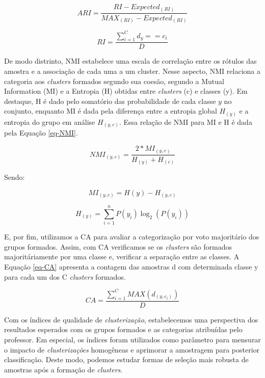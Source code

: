 \begin{equation}
ARI = \frac{RI - Expected_{(RI)}}{MAX_{(RI)} - Expected_{(RI)}}
\label{eq-ARI}
\end{equation}

\begin{equation*}
RI = \frac{\sum_{i=1}^{C} d_{y} == c_{i}}{D}
\end{equation*}

De modo distrinto, NMI estabelece uma escala de correlação entre os rótulos das amostra e a associação de cada uma a um cluster. Nesse aspecto, NMI relaciona a categoria aos \textit{clusters} formados segundo sua coesão, segundo a Mutual Information (MI) e a Entropia (H) obtidas entre \textit{clusters} (c) e classes (y). Em destaque, H é dado pelo somatório das probabilidade de cada classe $ y $ no conjunto, enquanto MI é dada pela diferença entre a entropia global $ H_{(y)} $ e a entropia do grupo em análise $ H_{(y, c)} $. Essa relação de NMI para MI e H é dada pela Equação \ref{eq-NMI}.

\begin{equation}
NMI_{(y,c)} = \frac{2*MI_{(y,c)}}{H_{(y)}+H_{(c)}}
\label{eq-NMI}
\end{equation}

Sendo:

\begin{equation*}
MI_{(y, c)} = H(y) - H_{(y, c)} 
\end{equation*}

\begin{equation*}
H_{(y)} = \sum_{i=1}^nP(y_{i})\log_{2}(P(y_{i}))
\end{equation*}

E, por fim, utilizamos a CA para avaliar a categorização por voto majoritário dos grupos formados. Assim, com CA verificamos se os \textit{clusters} são formados majoritáriamente por uma classe e, verificar a separação entre as classes. A Equação \ref{eq-CA} apresenta a contagem das amostras d com determinada classe y para cada um dos C \textit{clusters} formados.

\begin{equation}
CA = \frac{\sum_{i=1}^{C} MAX(d_{(y, c_{i})})}{D}
\label{eq-CA}
\end{equation}

Com os índices de qualidade de \textit{clusterização}, estabelecemos uma perspectiva dos resultados esperados com os grupos formados e as categorias atribuídas pelo professor. Em especial, os índices foram utilizados como parâmetro para mensurar o impacto de \textit{clusterizações} homogêneas e aprimorar a amostragem para posterior classificação. Deste modo, podemos estudar formas de seleção mais robusta de amostras após a formação de \textit{clusters}.


